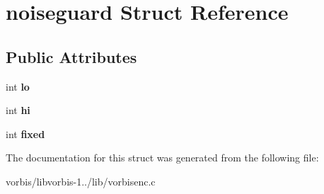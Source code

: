 \hypertarget{structnoiseguard}{\section{noiseguard Struct Reference}
\label{structnoiseguard}
}
\subsection*{Public Attributes}
\begin{DoxyCompactItemize}
\item 
\hypertarget{structnoiseguard_a536d7b7c61ad24a4f7b490f663d43dad}{int {\bfseries lo}}\label{structnoiseguard_a536d7b7c61ad24a4f7b490f663d43dad}

\item 
\hypertarget{structnoiseguard_a88d4adfe32e7ee064bf0319b8f41c0ac}{int {\bfseries hi}}\label{structnoiseguard_a88d4adfe32e7ee064bf0319b8f41c0ac}

\item 
\hypertarget{structnoiseguard_ac88cd650c02dd24cc058373fd693bdca}{int {\bfseries fixed}}\label{structnoiseguard_ac88cd650c02dd24cc058373fd693bdca}

\end{DoxyCompactItemize}


The documentation for this struct was generated from the following file\+:\begin{DoxyCompactItemize}
\item 
vorbis/libvorbis-\/1../lib/vorbisenc.\+c\end{DoxyCompactItemize}
